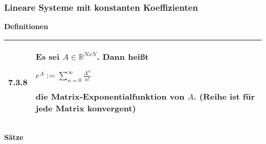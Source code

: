     

\subsubsection{Lineare Systeme mit konstanten Koeffizienten}

    \noindent
    \textbf{Definitionen}
      
    \begin{longtable}{p{1cm} p{16cm}}
        \toprule

        7.3.8 & Es sei $A\in \mathbb{R}^{NxN}$. Dann heißt \hfill \break
                \centerline{$ e^A := \sum^{\infty}_{n=0} \frac{A^n}{n!} $}
                die \textbf{Matrix-Exponentialfunktion} von $A$. \hfill \break
                (Reihe ist für jede Matrix konvergent)\\

        \bottomrule

    \end{longtable}
    

    \noindent 
    \textbf{Sätze}
    
